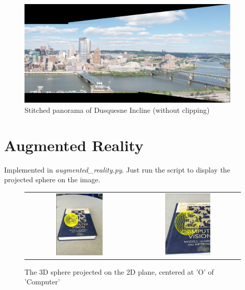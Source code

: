 \documentclass[a4paper]{article}
\begin{document}
\begin{figure}[!ht]
    \centering
    \includegraphics[width=0.95\textwidth]{images/pano_noclip}
    \caption{Stitched panorama of Dusquesne Incline (without clipping)}
\end{figure}

\clearpage
\section{Augmented Reality}

Implemented in \textit{augmented\_reality.py}. Just run the script to display the projected sphere on the image.

\begin{figure}[!ht]
\centering
\begin{tabular}{cc}
{\includegraphics[width=0.45\textwidth]{images/ar_ball}} &
{\includegraphics[width=0.45\textwidth]{images/ar_ball_zoom}}
\end{tabular}
\caption{The 3D sphere projected on the 2D plane, centered at 'O' of 'Computer'}
\end{figure}
\end{document}
